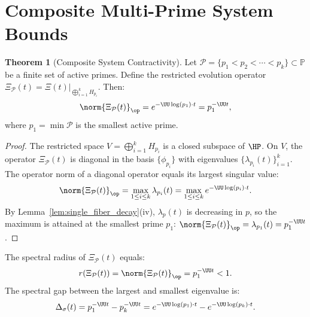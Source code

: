 \documentclass[12pt,letterpaper]{article}
\theoremstyle{definition}
\newtheorem{theorem}{Theorem}[section]
\theoremstyle{remark}
\begin{document}
\section{Composite Multi-Prime System Bounds}
\label{sec:composite}

\begin{theorem}[Composite System Contractivity]
\label{thm:composite}
Let $\mathcal{P} = \{p_1 < p_2 < \cdots < p_k\} \subset \mathbb{P}$ be a
finite set of active primes. Define the restricted evolution operator
$\Xi_\mathcal{P}(t) = \Xi(t)\big|_{\bigoplus_{i=1}^k H_{p_i}}$.
Then:
\begin{equation}
  \norm{\Xi_\mathcal{P}(t)}_\op
  = e^{-\UU\log(p_1)\cdot t}
  = p_1^{-\UU t},
  \label{eq:restricted_norm}
\end{equation}
where $p_1 = \min \mathcal{P}$ is the smallest active prime.
\end{theorem}

\begin{proof}
The restricted space $V = \bigoplus_{i=1}^k H_{p_i}$ is a closed subspace of $\HP$.
On $V$, the operator $\Xi_\mathcal{P}(t)$ is diagonal in the basis $\{\phi_{p_i}\}$
with eigenvalues $\{\lambda_{p_i}(t)\}_{i=1}^k$.
The operator norm of a diagonal operator equals its largest singular value:
\[
  \norm{\Xi_\mathcal{P}(t)}_\op
  = \max_{1\leq i \leq k} \lambda_{p_i}(t)
  = \max_{1\leq i \leq k} e^{-\UU\log(p_i)\cdot t}.
\]
By Lemma~\ref{lem:single_fiber_decay}(iv), $\lambda_p(t)$ is decreasing in $p$,
so the maximum is attained at the smallest prime $p_1$:
$\norm{\Xi_\mathcal{P}(t)}_\op = \lambda_{p_1}(t) = p_1^{-\UU t}$.
\end{proof}

\begin{corollary}
\label{cor:spectral_radius}
The spectral radius of $\Xi_\mathcal{P}(t)$ equals:
\begin{equation}
  r(\Xi_\mathcal{P}(t))
  = \norm{\Xi_\mathcal{P}(t)}_\op
  = p_1^{-\UU t} < 1.
\end{equation}
The spectral gap between the largest and smallest eigenvalue is:
\begin{equation}
  \Delta_\sigma(t)
  = p_1^{-\UU t} - p_k^{-\UU t}
  = e^{-\UU\log(p_1)\cdot t} - e^{-\UU\log(p_k)\cdot t}.
  \label{eq:spectral_gap}
\end{equation}
\end{corollary}
\end{document}
